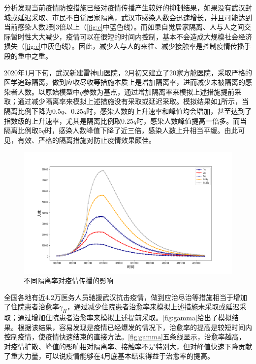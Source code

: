 \documentclass[withoutpre]{cumcmthesis} %
\begin{document}
分析发现当前疫情防控措施已经对疫情传播产生较好的抑制结果，如果没有武汉封城或延迟采取、市民不自觉居家隔离，武汉市感染人数会迅速增长，并且可能达到当前感染人数2到3倍以上（\cref{fig:c}中蓝色线）。而如果自觉居家隔离、人与人之间交际暂时性大大减少，疫情可以在很短的时间内控制，基本不会造成大规模社会经济损失（\cref{fig:c}中灰色线）。因此，减少人与人的来往、减少接触率是控制疫情传播手段的重中之重。


2020年1月下旬，武汉新建雷神山医院，2月初又建立了20家方舱医院，采取严格的医学追踪隔离，做到应收尽收等措施本质上是增加隔离率，进而减少未被隔离的感染者人数。以原始模型中$q$参数为基点，通过增加隔离率来模拟上述措施提前采取；通过减少隔离率来模拟上述措施没有采取或延迟采取。模拟结果如\cref{fig:h}所示，当隔离比例下降为$0.5q$、$0.25q$时，感染人数的上升速率和峰值均会增加，甚至达到了指数级的上升速率，尤其是隔离比例取$0.25q$时，感染人数峰值提高一倍多。而当隔离比例取$5q$时，感染人数峰值下降了近三倍，感染人数上升相当平缓。由此可见，有效、严格的隔离措施对防止疫情效果颇佳。
\begin{figure}[!h]
    \centering
    \includegraphics[width=1.0\textwidth]{figures/q.png}
    \caption{不同隔离率对疫情传播的影响}
    \label{fig:h}
\end{figure}


全国各地有近4.2万医务人员驰援武汉抗击疫情，做到应治尽治等措施相当于增加了住院患者治愈率$\gamma_H$，通过减少住院患者治愈率来模拟上述措施未采取或延迟采取；通过增加住院患者治愈率来模拟上述提前采取。\cref{fig:gamma}给出了模拟结果。根据该结果，容易发现是疫情已经爆发的情况下，治愈率的提高是较短时间内控制疫情，使疫情快速结束的直接方法。\cref{fig:gamma}五条线显示，治愈率越高，对疫情扩散、峰值的影响相对隔离率、接触率不是特别大，但对峰值快速下降贡献了重大力量，可以说疫情能够在4月底基本结束得益于治愈率的提高。
\end{document}
